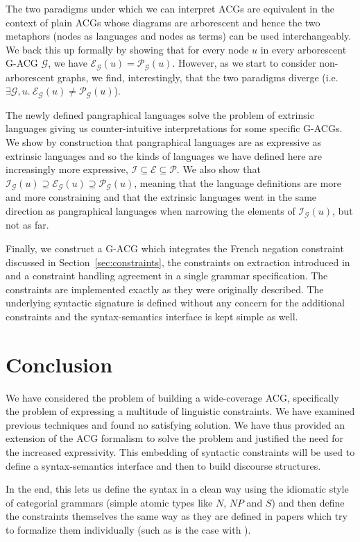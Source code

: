 \documentclass{llncs}
\begin{document}
The two paradigms under which we can interpret ACGs are equivalent in the
context of plain ACGs whose diagrams are arborescent and hence the two
metaphors (nodes as languages and nodes as terms) can be used
interchangeably. We back this up formally by showing that for every node $u$
in every arborescent G-ACG $\mathcal{G}$, we have
$\mathcal{E}_{\mathcal{G}}(u) = \mathcal{P}_{\mathcal{G}}(u)$. However, as we
start to consider non-arborescent graphs, we find, interestingly, that the two
paradigms diverge (i.e. $\exists \mathcal{G}, u.\ \mathcal{E}_{\mathcal{G}}(u)
\neq \mathcal{P}_{\mathcal{G}}(u)$).

The newly defined pangraphical languages solve the problem of extrinsic
languages giving us counter-intuitive interpretations for some specific
G-ACGs. We show by construction that pangraphical languages are as
expressive as extrinsic languages and so the kinds of languages we have
defined here are increasingly more expressive, $\mathcal{I} \subseteq
\mathcal{E} \subseteq \mathcal{P}$. We also show that
$\mathcal{I}_{\mathcal{G}}(u) \supseteq \mathcal{E}_{\mathcal{G}}(u)
\supseteq \mathcal{P}_{\mathcal{G}}(u)$, meaning that the language
definitions are more and more constraining and that the extrinsic
languages went in the same direction as pangraphical languages when
narrowing the elements of $\mathcal{I}_{\mathcal{G}}(u)$, but not as
far.

Finally, we construct a G-ACG which integrates the French negation constraint
discussed in Section~\ref{sec:constraints}, the constraints on extraction
introduced in \cite{pogodalla2012controlling} and a constraint handling
agreement in a single grammar specification. The constraints are implemented
exactly as they were originally described. The underlying syntactic signature
is defined without any concern for the additional constraints and the
syntax-semantics interface is kept simple as well.


\section{Conclusion}

We have considered the problem of building a wide-coverage ACG, specifically
the problem of expressing a multitude of linguistic constraints. We have
examined previous techniques and found no satisfying solution. We have thus
provided an extension of the ACG formalism to solve the problem and justified
the need for the increased expressivity. This embedding of syntactic
constraints will be used to define a syntax-semantics interface and then to
build discourse structures.

In the end, this lets us define the syntax in a clean way using the idiomatic
style of categorial grammars (simple atomic types like $N$, $NP$ and $S$) and
then define the constraints themselves the same way as they are defined in
papers which try to formalize them individually (such as is the case with
\cite{pogodalla2012controlling}).

%
%



\end{document}
